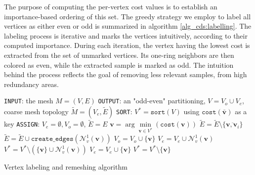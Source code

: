 \documentclass[graybox]{svmult}
\begin{document}
	The purpose of computing the per-vertex cost values is to establish an importance-based ordering of this set. The greedy strategy we employ to label all vertices as either even or odd is summarized in algorithm \ref{alg_cds:labelling}. The labeling process is iterative and marks the vertices intuitively, according to their computed importance. During each iteration, the vertex having the lowest cost is extracted from the set of unmarked vertices. Its one-ring neighbors are then colored as even, while the extracted sample is marked as odd. The intuition behind the process reflects the goal of removing less relevant samples, from high redundancy areas.
	\begin{algorithm}[t]
		\begin{algorithmic}
			\STATE \texttt{INPUT}: the mesh $M=(V,E)$
			\STATE \texttt{OUTPUT}: an "odd-even" partitioning, $V = {V_o} \cup {V_e}$, coarse mesh topology $\tilde{M}=(V_e,\tilde{E})$
			\STATE \texttt{SORT}: $V^{*} = \mathtt{sort}(V)$ using $\mathtt{cost}(\mathbf{\bar{v}})$ as a key
			\STATE \texttt{ASSIGN}: $V_e = \emptyset, V_o = \emptyset$, $\tilde{E} = E$
			\STATE $\mathbf{v} = \arg\min\limits_{\mathbf{v} \in V^{*}}(\mathtt{cost}(\mathbf{v}))$
			\STATE $\tilde{E} = \tilde{E} \setminus \{\overline{\mathbf{v}, \mathbf{v}_i}\}$
			\ENDFOR
			\STATE $\tilde{E} = \tilde{E} \cup \mathtt{create\_edges}(\mathcal{N}_v^1(\mathbf{v}))$
			\STATE $V_o = V_o \cup \{\mathbf{v}\}$
			\STATE $V_e = V_e \cup \mathcal{N}_v^1(\mathbf{v})$
			\STATE $V^{*} = V^{*} \setminus \left( \{ \mathbf{v} \} \cup \mathcal{N}_v^1(\mathbf{v}) \right)$
			\ELSE
			\STATE $V_e = V_e \cup \{\mathbf{v}\}$
			\STATE $V^{*} = V^{*} \setminus \{ \mathbf{v} \}$
			\ENDIF
			\ENDWHILE
		\end{algorithmic}
		\caption{Vertex labeling and remeshing algorithm}
		\label{alg_cds:labelling}
	\end{algorithm}
	
\end{document}
